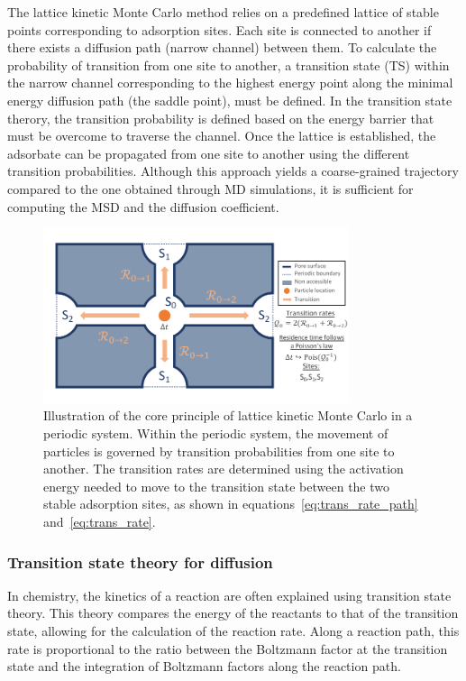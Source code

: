\documentclass[main]{subfiles}
\begin{document}
The lattice kinetic Monte Carlo method relies on a predefined lattice of stable points corresponding to adsorption sites. Each site is connected to another if there exists a diffusion path (narrow channel) between them. To calculate the probability of transition from one site to another, a transition state (TS) within the narrow channel corresponding to the highest energy point along the minimal energy diffusion path (the saddle point), must be defined. In the transition state therory, the transition probability is defined based on the energy barrier that must be overcome to traverse the channel. Once the lattice is established, the adsorbate can be propagated from one site to another using the different transition probabilities. Although this approach yields a coarse-grained trajectory compared to the one obtained through MD simulations, it is sufficient for computing the MSD and the diffusion coefficient.


\begin{figure}[ht]
  \centering
    \includegraphics[width=0.8\textwidth,trim={0.2cm 0.2cm 0cm 0.7cm},clip]{figures/5-diffusion/kinetic_MC.pdf}
    \caption{Illustration of the core principle of lattice kinetic Monte Carlo in a periodic system. Within the periodic system, the movement of particles is governed by transition probabilities from one site to another. The transition rates are determined using the activation energy needed to move to the transition state between the two stable adsorption sites, as shown in equations~\ref{eq:trans_rate_path} and~\ref{eq:trans_rate}. }\label{fgr:kMC_principle}
\end{figure}

\subsubsection{Transition state theory for diffusion}

In chemistry, the kinetics of a reaction are often explained using transition state theory. This theory compares the energy of the reactants to that of the transition state, allowing for the calculation of the reaction rate. Along a reaction path, this rate is proportional to the ratio between the Boltzmann factor at the transition state and the integration of Boltzmann factors along the reaction path.
\end{document}
